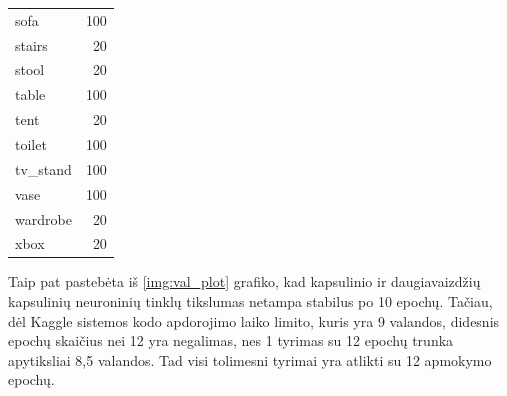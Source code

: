 \begin{table}[]
\begin{tabular}{lr}
	sofa        &                   100 \\
	stairs      &                    20 \\
	stool       &                    20 \\
	table       &                   100 \\
	tent        &                    20 \\
	toilet      &                   100 \\
	tv\_stand    &                   100 \\
	vase        &                   100 \\
	wardrobe    &                    20 \\
	xbox        &                    20 \\
\end{tabular}
\label{tbl:class_imbalance}
\end{table}


Taip pat pastebėta iš \ref{img:val_plot} grafiko, kad kapsulinio ir daugiavaizdžių kapsulinių neuroninių tinklų tikslumas netampa stabilus po 10 epochų. Tačiau, dėl Kaggle sistemos kodo apdorojimo laiko limito, kuris yra 9 valandos, didesnis epochų skaičius nei 12 yra negalimas, nes 1 tyrimas su 12 epochų trunka apytiksliai 8,5 valandos. Tad visi tolimesni tyrimai yra  atlikti su 12 apmokymo epochų.

